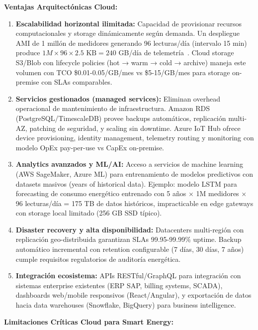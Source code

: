 \textbf{Ventajas Arquitectónicas Cloud:}

\begin{enumerate}
\item \textbf{Escalabilidad horizontal ilimitada:} Capacidad de provisionar recursos computacionales y storage dinámicamente según demanda. Un despliegue AMI de 1 millón de medidores generando 96 lecturas/día (intervalo 15 min) produce $1M \times 96 \times 2.5\text{ KB} = 240$ GB/día de telemetría~\cite{alsafranChallengesImplementingIoT2025}. Cloud storage S3/Blob con lifecycle policies (hot → warm → cold → archive) maneja este volumen con TCO \$0.01-0.05/GB/mes vs \$5-15/GB/mes para storage on-premise con SLAs comparables.

\item \textbf{Servicios gestionados (managed services):} Eliminan overhead operacional de mantenimiento de infraestructura. Amazon RDS (PostgreSQL/TimescaleDB) provee backups automáticos, replicación multi-AZ, patching de seguridad, y scaling sin downtime. Azure IoT Hub ofrece device provisioning, identity management, telemetry routing y monitoring con modelo OpEx pay-per-use vs CapEx on-premise.

\item \textbf{Analytics avanzados y ML/AI:} Acceso a servicios de machine learning (AWS SageMaker, Azure ML) para entrenamiento de modelos predictivos con datasets masivos (years of historical data). Ejemplo: modelo LSTM para forecasting de consumo energético entrenado con 5 años $\times$ 1M medidores $\times$ 96 lecturas/día = 175 TB de datos históricos, impracticable en edge gateways con storage local limitado (256 GB SSD típico).

\item \textbf{Disaster recovery y alta disponibilidad:} Datacenters multi-región con replicación geo-distribuida garantizan SLAs 99.95-99.99\% uptime. Backup automático incremental con retention configurable (7 días, 30 días, 7 años) cumple requisitos regulatorios de auditoría energética.

\item \textbf{Integración ecosistema:} APIs RESTful/GraphQL para integración con sistemas enterprise existentes (ERP SAP, billing systems, SCADA), dashboards web/mobile responsivos (React/Angular), y exportación de datos hacia data warehouses (Snowflake, BigQuery) para business intelligence.
\end{enumerate}

\textbf{Limitaciones Críticas Cloud para Smart Energy:}

